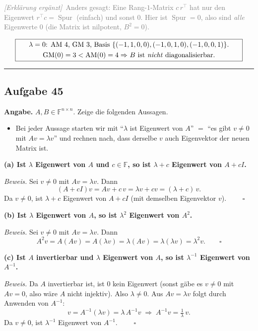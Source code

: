\documentclass[a4paper,12pt]{article}
\newcommand{\erglerk}{\textcolor{gray}{\small\textit{[Erkl\"arung erg\"anzt]}}}
\newcommand{\EW}{Eigenwert}
\newcommand{\EV}{Eigenvektor}
\begin{document}
\erglerk\ \textcolor{gray}{\small Anders gesagt: Eine Rang-$1$-Matrix $c\,r^\top$ hat nur den \EW{} $r^\top c = \operatorname{Spur}$ (einfach) und sonst $0$. Hier ist $\operatorname{Spur} = 0$, also sind \emph{alle} \EW{}e $0$ (die Matrix ist nilpotent, $B^2 = 0$).}

\[
\fbox{\parbox{0.93\textwidth}{\centering
$\lambda = 0$: AM $4$, GM $3$, Basis $\{(-1,1,0,0),(-1,0,1,0),(-1,0,0,1)\}$. \\[3pt]
GM$(0) = 3 < {}$AM$(0) = 4 \Rightarrow$ $B$ ist \emph{nicht} diagonalisierbar.
}}
\]

\bigskip
\hrule
\bigskip

\subsection*{Aufgabe 45}

\textbf{Angabe.} $A, B \in \mathbb{F}^{n\times n}$. Zeige die folgenden Aussagen.

\begin{wastun}
\begin{itemize}[leftmargin=*, nosep]
    \item Bei jeder Aussage starten wir mit ``$\lambda$ ist \EW{} von $A$'' $=$ ``es gibt $v \neq 0$ mit $Av = \lambda v$'' und rechnen nach, dass derselbe $v$ auch \EV{} der neuen Matrix ist.
\end{itemize}
\end{wastun}

\textbf{(a) Ist $\lambda$ \EW{} von $A$ und $c \in \mathbb{F}$, so ist $\lambda + c$ \EW{} von $A + cI$.}

\textit{Beweis.} Sei $v \neq 0$ mit $Av = \lambda v$. Dann
\[
(A + cI)v = Av + c\,v = \lambda v + c v = (\lambda + c)\,v.
\]
Da $v \neq 0$, ist $\lambda + c$ \EW{} von $A + cI$ (mit demselben \EV{} $v$). $\qquad\square$

\textbf{(b) Ist $\lambda$ \EW{} von $A$, so ist $\lambda^2$ \EW{} von $A^2$.}

\textit{Beweis.} Sei $v \neq 0$ mit $Av = \lambda v$. Dann
\[
A^2 v = A(Av) = A(\lambda v) = \lambda (Av) = \lambda (\lambda v) = \lambda^2 v. \qquad\square
\]

\textbf{(c) Ist $A$ invertierbar und $\lambda$ \EW{} von $A$, so ist $\lambda^{-1}$ \EW{} von $A^{-1}$.}

\textit{Beweis.} Da $A$ invertierbar ist, ist $0$ kein \EW{} (sonst g\"abe es $v \neq 0$ mit $Av = 0$, also w\"are $A$ nicht injektiv). Also $\lambda \neq 0$. Aus $Av = \lambda v$ folgt durch Anwenden von $A^{-1}$:
\[
v = A^{-1}(\lambda v) = \lambda\, A^{-1} v \;\Longrightarrow\; A^{-1} v = \tfrac{1}{\lambda}\, v.
\]
Da $v \neq 0$, ist $\lambda^{-1}$ \EW{} von $A^{-1}$. $\qquad\square$
\end{document}
